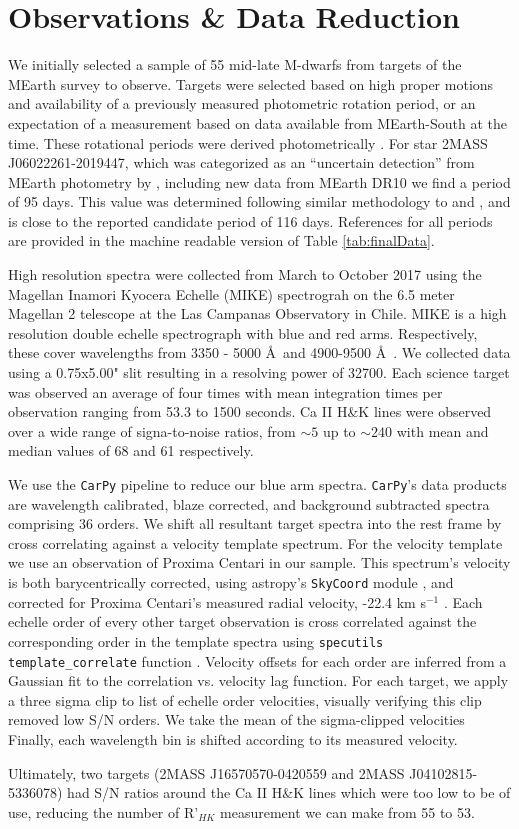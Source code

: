 \section{Observations \& Data Reduction}\label{sec:Observations}
We initially selected a sample of 55 mid-late M-dwarfs from targets of
the MEarth survey \citep{Ber12} to observe. Targets were selected based on high
proper motions and availability of a previously measured photometric rotation
period, or an expectation of a measurement based on data available from
MEarth-South at the time. These rotational periods were derived photometrically
\citep[e.g.][]{Newton2016,Man16,Med20}. For star 2MASS J06022261-2019447, which
was categorized as an ``uncertain detection'' from MEarth photometry by
\citet{Newton2018}, including new data from MEarth DR10 we find a period of 95
days. This value was determined following similar methodology to \citet{Irw11}
and \citet{Newton2016,Newton2018}, and is close to the reported candidate
period of 116 days.  References for all periods are provided in the machine
readable version of Table \ref{tab:finalData}.   

High resolution spectra were collected from March to October 2017 using the
Magellan Inamori Kyocera Echelle (MIKE) spectrograh on the 6.5 meter Magellan 2
telescope at the Las Campanas Observatory in Chile. MIKE is a high resolution
double echelle spectrograph with blue and red arms. Respectively, these cover
wavelengths from 3350 - 5000 \AA\ and 4900-9500 \AA\ \citep{Ber03}. We
collected data using a 0.75x5.00" slit resulting in a resolving power of 32700.
Each science target was observed an average of four times with mean integration
times per observation ranging from 53.3 to 1500 seconds. Ca II H\&K
lines were observed over a wide range of signa-to-noise ratios, from $\sim 5$ up
to $\sim 240$ with mean and median values of 68 and 61 respectively.

We use the \texttt{CarPy} pipeline \citep{Kel00, Kel03} to reduce our blue arm
spectra. \texttt{CarPy}'s data products are wavelength calibrated, blaze
corrected, and background subtracted spectra comprising 36 orders. We shift all
resultant target spectra into the rest frame by cross correlating against a
velocity template spectrum. For the velocity template we use an observation of
Proxima Centari in our sample. This spectrum's velocity is both barycentrically
corrected, using astropy's \texttt{SkyCoord} module \citep{Ast18}, and
corrected for Proxima Centari's measured radial velocity, -22.4 km s$^{-1}$
\citep{Tor06}. Each echelle order of every other target observation is cross
correlated against the corresponding order in the template spectra using
\texttt{specutils} \texttt{template\_correlate} function \citep{Nic21}.
Velocity offsets for each order are inferred from a Gaussian fit to the
correlation vs. velocity lag function. For each target, we apply a three sigma
clip to list of echelle order velocities, visually verifying this clip removed
low S/N orders. We take the mean of the sigma-clipped velocities Finally, each
wavelength bin is shifted according to its measured velocity.

Ultimately, two targets (2MASS J16570570-0420559 and 2MASS J04102815-5336078)
had S/N ratios around the Ca II H\&K lines which were too low to be of use,
reducing the number of R'$_{HK}$ measurement we can make from 55 to 53. 
